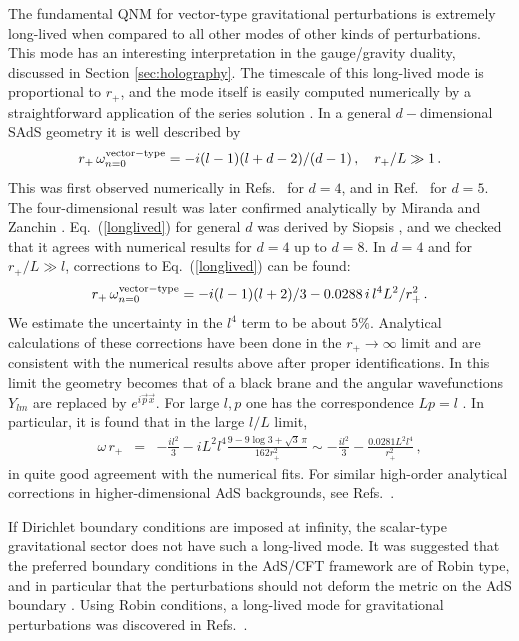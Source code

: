 \documentclass[]{iopart}
\def\be{\begin{equation}}
\def\ee{\end{equation}}
\def\beq{\begin{eqnarray}}
\def\eeq{\end{eqnarray}}
\begin{document}
The fundamental QNM for vector-type gravitational perturbations is extremely
long-lived when compared to all other modes of other kinds of
perturbations. This mode has an interesting interpretation in the
gauge/gravity duality, discussed in Section \ref{sec:holography}. The
timescale of this long-lived mode is proportional to $r_+$, and the mode
itself is easily computed numerically by a straightforward application of the
series solution \cite{Cardoso:2001bb,Cardoso:2003cj}. In a general
$d-$dimensional SAdS geometry it is well described by
%
\be 
r_+\, \omega^{\rm vector-type}_{n=0}=-i(l-1)(l+d-2)/(d-1)\,,\quad
r_+/L\gg1\,. 
\label{longlived}
\ee
%
This was first observed numerically in
Refs.~\cite{Cardoso:2001bb,Cardoso:2003cj} for $d=4$, and in
Ref.~\cite{Friess:2006kw} for $d=5$. The four-dimensional result was later
confirmed analytically by Miranda and Zanchin \cite{Miranda:2005qx}.
Eq.~(\ref{longlived}) for general $d$ was derived by Siopsis
\cite{Siopsis:2007wn}, and we checked that it agrees with numerical results
for $d=4$ up to $d=8$. In $d=4$ and for $r_+/L\gg l$, corrections to
Eq.~(\ref{longlived}) can be found:
%
\be 
r_+\, \omega^{\rm vector-type}_{n=0}=
-i(l-1)(l+2)/3-0.0288\,i\,l^4L^2/r_+^2\,.
\label{longlived2}
\ee
%
We estimate the uncertainty in the $l^4$ term to be about $5\%$.  Analytical
calculations of these corrections have been done in the $r_+ \to \infty$ limit
\cite{Kovtun:2005ev,Natsuume:2007ty,Natsuume:2008iy} and are consistent with
the numerical results above after proper identifications. In this limit the
geometry becomes that of a black brane and the angular wavefunctions $Y_{lm}$
are replaced by $e^{i{\vec p}{\vec x}}$. For large $l,p$ one has the
correspondence $Lp=l$ \cite{Festuccia:2008zx}. In particular, it is found that
in the large $l/L$ limit,
%
\beq
\omega\,r_+&=&-\frac{il^2}{3}-iL^2l^4\frac{9-9\log3+\sqrt{3}\,\pi}{162r_+^2}\sim-\frac{il^2}{3}-\frac{0.0281L^2l^4}{r_+^2}\,,
\eeq
%
in quite good agreement with the numerical fits. For similar high-order
analytical corrections in higher-dimensional AdS backgrounds, see
Refs.~\cite{Kovtun:2005ev,Natsuume:2007ty,Natsuume:2008iy}.

If Dirichlet boundary conditions are imposed at infinity, the scalar-type
gravitational sector does not have such a long-lived mode.  It was suggested
that the preferred boundary conditions in the AdS/CFT framework are of Robin
type, and in particular that the perturbations should not deform the metric on
the AdS boundary \cite{Friess:2006kw,Michalogiorgakis:2006jc}.  Using Robin
conditions, a long-lived mode for gravitational perturbations was discovered
in Refs.~\cite{Friess:2006kw,Michalogiorgakis:2006jc,Siopsis:2007wn}.
\end{document}
